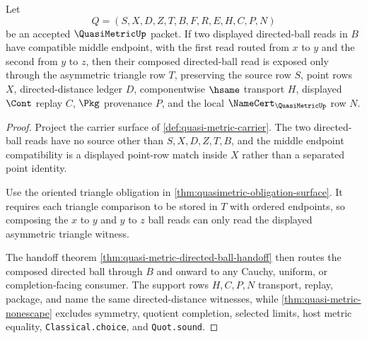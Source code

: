 \begin{theorem}
\label{thm:quasimetric-directed-ball-triangle-refinement}
Let
$$
Q=(S,X,D,Z,T,B,F,R,E,H,C,P,N)
$$
be an accepted $\QuasiMetricUp$ packet. If two displayed directed-ball reads in $B$ have compatible middle endpoint, with the first read routed from $x$ to $y$ and the second from $y$ to $z$, then their composed directed-ball read is exposed only through the asymmetric triangle row $T$, preserving the source row $S$, point rows $X$, directed-distance ledger $D$, componentwise $\hsame$ transport $H$, displayed $\Cont$ replay $C$, $\Pkg$ provenance $P$, and the local $\NameCert_{\QuasiMetricUp}$ row $N$.
\end{theorem}
\begin{proof}
Project the carrier surface of \autoref{def:quasi-metric-carrier}. The two directed-ball reads have no source other than $S,X,D,Z,T,B$, and the middle endpoint compatibility is a displayed point-row match inside $X$ rather than a separated point identity.

Use the oriented triangle obligation in \autoref{thm:quasimetric-obligation-surface}. It requires each triangle comparison to be stored in $T$ with ordered endpoints, so composing the $x$ to $y$ and $y$ to $z$ ball reads can only read the displayed asymmetric triangle witness.

The handoff theorem \autoref{thm:quasi-metric-directed-ball-handoff} then routes the composed directed ball through $B$ and onward to any Cauchy, uniform, or completion-facing consumer. The support rows $H,C,P,N$ transport, replay, package, and name the same directed-distance witnesses, while \autoref{thm:quasi-metric-nonescape} excludes symmetry, quotient completion, selected limits, host metric equality, \texttt{Classical.choice}, and \texttt{Quot.sound}.
\end{proof}

